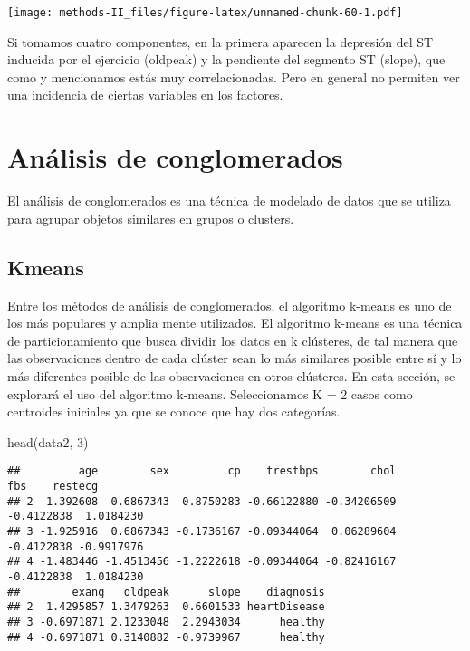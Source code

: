 \documentclass[
]{article}
\newenvironment{Shaded}{\begin{snugshade}}{\end{snugshade}}
\newcommand{\DecValTok}[1]{\textcolor[rgb]{0.00,0.00,0.81}{#1}}
\newcommand{\FunctionTok}[1]{\textcolor[rgb]{0.00,0.00,0.00}{#1}}
\newcommand{\NormalTok}[1]{#1}
\begin{document}
\texttt{[image: methods-II\_files/figure-latex/unnamed-chunk-60-1.pdf]}

Si tomamos cuatro componentes, en la primera aparecen la depresión del
ST inducida por el ejercicio (oldpeak) y la pendiente del segmento ST
(slope), que como y mencionamos estás muy correlacionadas. Pero en
general no permiten ver una incidencia de ciertas variables en los
factores.

\hypertarget{anuxe1lisis-de-conglomerados}{%
\section{Análisis de conglomerados}\label{anuxe1lisis-de-conglomerados}}

El análisis de conglomerados es una técnica de modelado de datos que se
utiliza para agrupar objetos similares en grupos o clusters.

\hypertarget{kmeans}{%
\subsection{Kmeans}\label{kmeans}}

Entre los métodos de análisis de conglomerados, el algoritmo k-means es
uno de los más populares y amplia mente utilizados. El algoritmo k-means
es una técnica de particionamiento que busca dividir los datos en k
clústeres, de tal manera que las observaciones dentro de cada clúster
sean lo más similares posible entre sí y lo más diferentes posible de
las observaciones en otros clústeres. En esta sección, se explorará el
uso del algoritmo k-means. Seleccionamos K = 2 casos como centroides
iniciales ya que se conoce que hay dos categorías.

\begin{Shaded}
\begin{Highlighting}[]
\FunctionTok{head}\NormalTok{(data2, }\DecValTok{3}\NormalTok{)}
\end{Highlighting}
\end{Shaded}

\begin{verbatim}
##         age        sex         cp    trestbps        chol        fbs    restecg
## 2  1.392608  0.6867343  0.8750283 -0.66122880 -0.34206509 -0.4122838  1.0184230
## 3 -1.925916  0.6867343 -0.1736167 -0.09344064  0.06289604 -0.4122838 -0.9917976
## 4 -1.483446 -1.4513456 -1.2222618 -0.09344064 -0.82416167 -0.4122838  1.0184230
##        exang   oldpeak      slope    diagnosis
## 2  1.4295857 1.3479263  0.6601533 heartDisease
## 3 -0.6971871 2.1233048  2.2943034      healthy
## 4 -0.6971871 0.3140882 -0.9739967      healthy
\end{verbatim}
\end{document}
